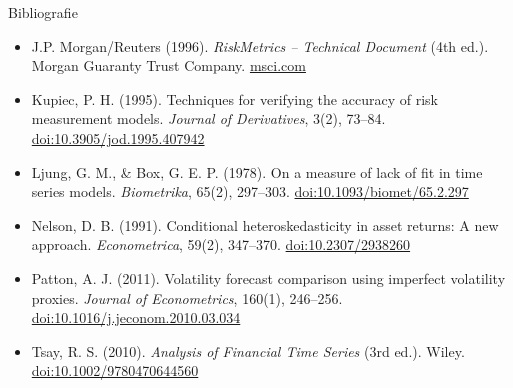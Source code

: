 \begin{frame}{Bibliografie}
\begin{itemize}
    \item J.P. Morgan/Reuters (1996). \textit{RiskMetrics -- Technical Document} (4th ed.). Morgan Guaranty Trust Company. \href{https://www.msci.com/documents/10199/5915b101-4206-4ba0-aee2-3449d5c7e95a}{msci.com}
    \item Kupiec, P. H. (1995). Techniques for verifying the accuracy of risk measurement models. \textit{Journal of Derivatives}, 3(2), 73--84. \href{https://doi.org/10.3905/jod.1995.407942}{doi:10.3905/jod.1995.407942}
    \item Ljung, G. M., \& Box, G. E. P. (1978). On a measure of lack of fit in time series models. \textit{Biometrika}, 65(2), 297--303. \href{https://doi.org/10.1093/biomet/65.2.297}{doi:10.1093/biomet/65.2.297}
    \item Nelson, D. B. (1991). Conditional heteroskedasticity in asset returns: A new approach. \textit{Econometrica}, 59(2), 347--370. \href{https://doi.org/10.2307/2938260}{doi:10.2307/2938260}
    \item Patton, A. J. (2011). Volatility forecast comparison using imperfect volatility proxies. \textit{Journal of Econometrics}, 160(1), 246--256. \href{https://doi.org/10.1016/j.jeconom.2010.03.034}{doi:10.1016/j.jeconom.2010.03.034}
    \item Tsay, R. S. (2010). \textit{Analysis of Financial Time Series} (3rd ed.). Wiley. \href{https://doi.org/10.1002/9780470644560}{doi:10.1002/9780470644560}
\end{itemize}
\end{frame}


